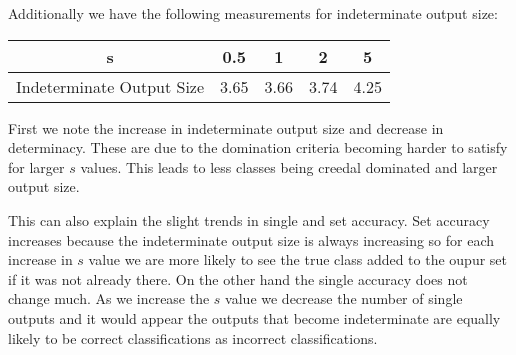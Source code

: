 
Additionally we have the following measurements for indeterminate output size:
\begin{center}
\begin{tabular}{c|c c c c}
s & 0.5 & 1 & 2 & 5 \\
\hline
Indeterminate Output Size & 3.65 & 3.66 & 3.74 & 4.25
\end{tabular}
\end{center}

First we note the increase in indeterminate output size and decrease in determinacy.
These are due to the domination criteria becoming harder to satisfy for larger $s$ values.
This leads to less classes being creedal dominated and larger output size.

This can also explain the slight trends in single and set accuracy.
Set accuracy increases because the indeterminate output size is always increasing so for each increase in $s$ value we are more likely to see the true class added to the oupur set if it was not already there.
On the other hand the single accuracy does not change much.
As we increase the $s$ value we decrease the number of single outputs and it would appear the outputs that become indeterminate are equally likely to be correct classifications as incorrect classifications.

